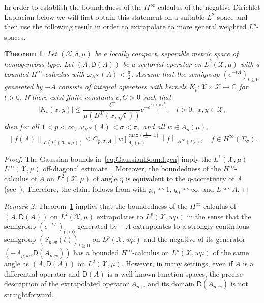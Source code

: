 \documentclass[12pt,a4paper, reqno]{amsart}
\theoremstyle{plain}
\newtheorem{theorem}{Theorem}[section]
\theoremstyle{definition}
\theoremstyle{remark}
\newtheorem{remark}[theorem]{Remark}
\numberwithin{equation}{section}
\newcommand{\1}{\mathbbm{1}}
\newcommand{\C}{\ensuremath{\mathbb{C}}}
\newcommand{\calX}{\ensuremath{\mathcal{X}}}
\newcommand{\sL}{\ensuremath{\mathscr{L}}}
\newcommand{\sfD}{\ensuremath{\mathsf{D}}}
\newcommand{\nrm}[1]{\left\lVert #1 \right\rVert}
\begin{document}
\medskip

In order to establish the boundedness of the $H^\infty$-calculus of the negative Dirichlet Laplacian below we will first obtain this statement on a suitable $L^2$-space and then use the following result in order to extrapolate to more general weighted $L^p$-spaces.

\begin{theorem}\label{functionalcalculus:extrapolation:BFP}
    Let $(\calX,\delta,\mu)$ be a locally compact, separable metric space of homogeneous type. 
    Let $(A, \sfD(A))$ be a sectorial operator on $L^2(\calX,\mu)$ with a bounded $H^\infty$-calculus with $\omega_{H^\infty}(A)<\tfrac{\pi}{2}$. Assume that the semigroup $(e^{-tA})_{t\geq 0}$ generated by $-A$ consists of integral operators with kernels  $K_t \colon \calX\times \calX \rightarrow\C $ for $ t>0$. If there exist finite constants $c,C>0$ such that 
    \begin{equation}\label{eq:GaussianBound:gen}
    |K_t(x,y)|\le \frac{C}{\mu(B^{\calX}(x,\sqrt{t}))}e^{-c\frac{\delta(x,y)^2}{t}},\quad t>0,\,\, x,y\in \calX,
    \end{equation}
    then for all $1<p<\infty$, $\omega_{H^\infty}(A) <\sigma<\pi,$ and all $w\in A_p(\mu)$, 
    \begin{equation}\label{eq:Hinf:extrapol}
    \nrm{f(A)}_{\sL(L^p(\calX,w\mu))} \le C_{p,\sigma,A}\,[w]_{A_p(\mu)}^{\max\big\{\frac{1}{p-1},1\big\}} \nrm{f}_{H^\infty(\Sigma_\sigma)},\quad
    f\in H^\infty(\Sigma_\sigma).
    \end{equation}
\end{theorem}
\begin{proof}
The Gaussian bounds in~\eqref{eq:GaussianBound:gen} imply  
the $L^1(\calX,\mu)$--$L^\infty(\calX, \mu)$ off-diagonal estimate~\cite[Equation (1-1)]{BernicotFreyPetermichl_2016}. Moreover, the boundedness of the $H^\infty$-calculus of $A$ on $L^2(\calX,\mu)$ of angle $\eta$ is equivalent to the $\eta$-accretivity of $A$ (see~\cite[Theorem 11.13]{Kunstmann2004}).   
Therefore, the claim follows from \cite[Theorem 3.1]{BernicotFreyPetermichl_2016} with $p_0\curvearrowleft1$, $ q_0\curvearrowleft\infty$, and $L\curvearrowleft A$. 
\end{proof}

\begin{remark}\label{rem:extrapol:ident}
Theorem~\ref{functionalcalculus:extrapolation:BFP} implies that the boundedness of the $H^\infty$-calculus of $(A,\sfD(A))$ on $L^2(\calX,\mu)$ extrapolates to $L^p(\calX,w\mu)$ in the sense that the semigroup $(e^{-tA})_{t\geq 0}$ generated by $-A$ extrapolates to a strongly continuous semigroup $(S_{p,w}(t))_{t\geq 0}$ on $L^p(\calX,w\mu)$ and the negative of its generator $(-A_{p,w},\sfD(A_{p,w}))$  has a bounded $H^\infty$-calculus on $L^p(\calX,w\mu)$ of the same angle as $(A,\sfD(A))$ on $L^2(\calX,\mu)$.
However, in many settings, even if $A$ is a differential operator and $\sfD(A)$ is a well-known function spaces, the precise description of the extrapolated operator $A_{p,w}$ and its domain $\sfD(A_{p,w})$ is not straightforward. 
\end{remark}
    
\end{document}
